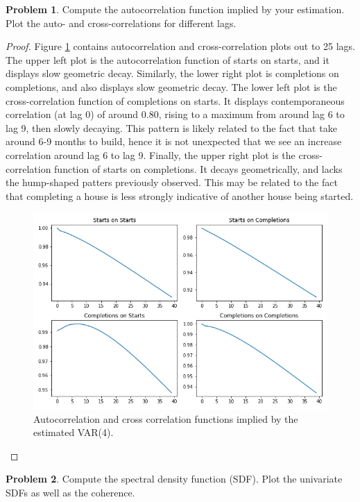 \documentclass[oneside,reqno]{amsart}
\theoremstyle{definition}
\newtheorem{prob}{Problem}
\begin{document}
\begin{prob}
Compute the autocorrelation function implied by your estimation. Plot the auto- and cross-correlations for different lags. 
\end{prob}

\begin{proof}
Figure \ref{acf-plots} contains autocorrelation and cross-correlation plots out to 25 lags. The upper left plot is the autocorrelation function of starts on starts, and it displays slow geometric decay. Similarly, the lower right plot is completions on completions, and also displays slow geometric decay. The lower left plot is the cross-correlation function of completions on starts. It displays contemporaneous correlation (at lag 0) of around $0.80$, rising to a maximum from around lag 6 to lag 9, then slowly decaying. This pattern is likely related to the fact that take around 6-9 months to build, hence it is not unexpected that we see an increase correlation around lag 6 to lag 9. Finally, the upper right plot is the cross-correlation function of starts on completions. It decays geometrically, and lacks the hump-shaped patters previously observed. This may be related to the fact that completing a house is less strongly indicative of another house being started.
\begin{figure}
\includegraphics[width=\textwidth]{acf-plots}
\caption{Autocorrelation and cross correlation functions implied by the estimated VAR(4).}
\label{acf-plots}
\end{figure}

\end{proof}

\begin{prob}
Compute the spectral density function (SDF). Plot the univariate SDFs as well as the coherence.
\end{prob}
\end{document}
